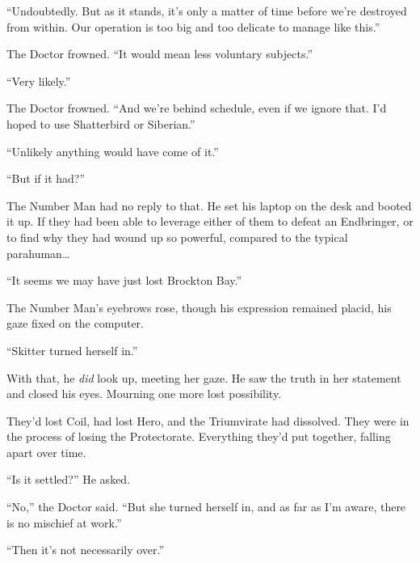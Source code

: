 ``Undoubtedly.  But as it stands, it's only a matter of time before we're destroyed from within.  Our operation is too big and too delicate to manage like this.''



The Doctor frowned.  ``It would mean less voluntary subjects.''



``Very likely.''



The Doctor frowned.  ``And we're behind schedule, even if we ignore that.  I'd hoped to use Shatterbird or Siberian.''



``Unlikely anything would have come of it.''



``But if it had?''



The Number Man had no reply to that.  He set his laptop on the desk and booted it up.  If they had been able to leverage either of them to defeat an Endbringer, or to find why they had wound up so powerful, compared to the typical parahuman\ldots



``It seems we may have just lost Brockton Bay.''



The Number Man's eyebrows rose, though his expression remained placid, his gaze fixed on the computer.



``Skitter turned herself in.''



With that, he \emph{did} look up, meeting her gaze.  He saw the truth in her statement and closed his eyes.  Mourning one more lost possibility.



They'd lost Coil, had lost Hero, and the Triumvirate had dissolved.  They were in the process of losing the Protectorate.  Everything they'd put together, falling apart over time.



``Is it settled?''  He asked.



``No,'' the Doctor said.  ``But she turned herself in, and as far as I'm aware, there is no mischief at work.''



``Then it's not necessarily over.''



